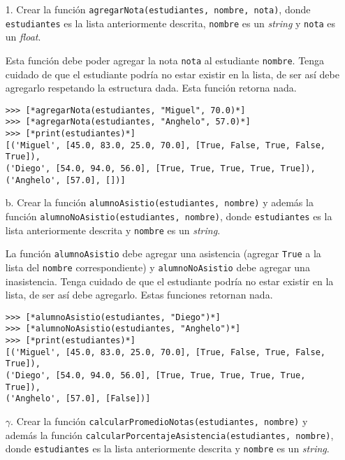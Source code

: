 \begin{enumerate}
	\item[1. ] Crear la función \texttt{agregarNota(estudiantes, nombre, nota)}, donde \texttt{estudiantes} es la lista anteriormente descrita, \texttt{nombre} es un \textit{string} y \texttt{nota} es un \textit{float}. 

    Esta función debe poder agregar la nota \texttt{nota} al estudiante \texttt{nombre}. Tenga cuidado de que el estudiante podría no estar existir en la lista, de ser así debe agregarlo respetando la estructura dada. Esta función retorna nada.

\begin{lstlisting}[style=consola]
>>> [*agregarNota(estudiantes, "Miguel", 70.0)*]
>>> [*agregarNota(estudiantes, "Anghelo", 57.0)*]
>>> [*print(estudiantes)*]
[('Miguel', [45.0, 83.0, 25.0, 70.0], [True, False, True, False, True]),
('Diego', [54.0, 94.0, 56.0], [True, True, True, True, True]), 
('Anghelo', [57.0], [])]
\end{lstlisting}

    \item[b.] Crear la función \texttt{alumnoAsistio(estudiantes, nombre)} y además la función \newline \texttt{alumnoNoAsistio(estudiantes, nombre)}, donde \texttt{estudiantes} es la lista anteriormente descrita y \texttt{nombre} es un \textit{string}.

    La función \texttt{alumnoAsistio} debe agregar una asistencia (agregar \texttt{True} a la lista del \texttt{nombre} correspondiente) y \texttt{alumnoNoAsistio} debe agregar una inasistencia. Tenga cuidado de que el estudiante podría no estar existir en la lista, de ser así debe agregarlo. Estas funciones retornan nada. 
    
\begin{lstlisting}[style=consola]
>>> [*alumnoAsistio(estudiantes, "Diego")*]
>>> [*alumnoNoAsistio(estudiantes, "Anghelo")*]
>>> [*print(estudiantes)*]
[('Miguel', [45.0, 83.0, 25.0, 70.0], [True, False, True, False, True]),
('Diego', [54.0, 94.0, 56.0], [True, True, True, True, True, True]), 
('Anghelo', [57.0], [False])]
\end{lstlisting}

    \item[$\gamma$.] Crear la función \texttt{calcularPromedioNotas(estudiantes, nombre)} y además la función \texttt{calcularPorcentajeAsistencia(estudiantes, nombre)}, donde \texttt{estudiantes} es la lista anteriormente descrita y \texttt{nombre} es un \textit{string}. 


\end{enumerate}
